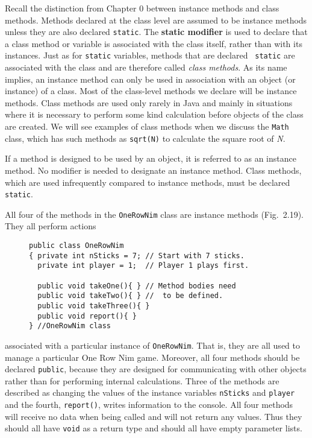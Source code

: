 Recall the distinction from Chapter 0 between instance methods and
class methods. Methods declared at the class level are assumed to be
instance methods unless they are also declared {\tt static}.  The {\bf
static modifier} is used to declare that a class method or variable is
associated with the class itself, rather than with its instances. 
Just as for {\tt static} variables, methods that are declared {\tt
static} are associated with the class and are therefore called {\it
class methods}.  As its name implies, an instance method can only be
used in association with an object (or instance) of a class. Most of
the class-level methods we declare will be instance methods. Class
methods are used only rarely in Java and mainly in situations where it
is necessary to perform some kind calculation before objects of the
class are created. We will see examples of class methods when we
discuss the {\tt Math} class, which has such methods as {\tt sqrt(N)}
to calculate the square root of {\it N}.

 {If a method is
designed to be used by an object, it is referred to as an instance
method. No modifier is needed to designate an instance method. Class
methods, which are used infrequently compared to instance methods,
must be declared {\tt static}.}

\noindent All four of the methods in the {\tt OneRowNim} class are
instance methods (Fig.~2.19). They all perform actions
\begin{figure}[hbt]
\jjjprogstart
\begin{jjjlisting}
\begin{lstlisting}
public class OneRowNim 
{ private int nSticks = 7; // Start with 7 sticks.
  private int player = 1;  // Player 1 plays first.

  public void takeOne(){ } // Method bodies need
  public void takeTwo(){ } //  to be defined.
  public void takeThree(){ }
  public void report(){ }
} //OneRowNim class
\end{lstlisting}
\end{jjjlisting}
\end{figure}
associated with a particular instance of {\tt OneRowNim}. That is,
they are all used to manage a particular One Row Nim game.  Moreover,
all four methods should be declared {\tt public}, because they are
designed for communicating with other objects rather than for
performing internal calculations. Three of the methods are described
as changing the values of the instance variables {\tt nSticks} and
{\tt player} and the fourth, {\tt report()}, writes information to the
console.  All four methods will receive no data when being called and
will not return any values.  Thus they should all have {\tt void} as a
return type and should all have empty parameter lists. 

